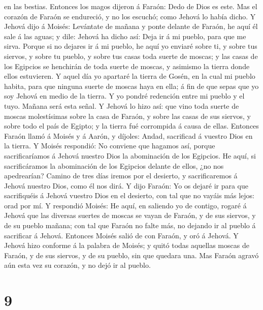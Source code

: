 en las bestias.  Entonces los magos dijeron á Faraón:
Dedo de Dios es este. Mas el corazón de Faraón se endureció, y no los
escuchó; como Jehová lo había dicho.  Y Jehová dijo á
Moisés: Levántate de mañana y ponte delante de Faraón, he aquí él sale á
las aguas; y dile: Jehová ha dicho así: Deja ir á mi pueblo, para que me
sirva.  Porque si no dejares ir á mi pueblo, he aquí yo
enviaré sobre ti, y sobre tus siervos, y sobre tu pueblo, y sobre tus
casas toda suerte de moscas; y las casas de los Egipcios se henchirán de
toda suerte de moscas, y asimismo la tierra donde ellos estuvieren.
 Y aquel día yo apartaré la tierra de Gosén, en la cual
mi pueblo habita, para que ninguna suerte de moscas haya en ella; á fin
de que sepas que yo soy Jehová en medio de la tierra.  Y
yo pondré redención entre mi pueblo y el tuyo. Mañana será esta señal.
 Y Jehová lo hizo así: que vino toda suerte de moscas
molestísimas sobre la casa de Faraón, y sobre las casas de sus siervos,
y sobre todo el país de Egipto; y la tierra fué corrompida á causa de
ellas.  Entonces Faraón llamó á Moisés y á Aarón, y
díjoles: Andad, sacrificad á vuestro Dios en la tierra. 
Y Moisés respondió: No conviene que hagamos así, porque sacrificaríamos
á Jehová nuestro Dios la abominación de los Egipcios. He aquí, si
sacrificáramos la abominación de los Egipcios delante de ellos, ¿no nos
apedrearían?  Camino de tres días iremos por el desierto,
y sacrificaremos á Jehová nuestro Dios, como él nos dirá.
 Y dijo Faraón: Yo os dejaré ir para que sacrifiquéis á
Jehová vuestro Dios en el desierto, con tal que no vayáis más lejos:
orad por mí.  Y respondió Moisés: He aquí, en saliendo yo
de contigo, rogaré á Jehová que las diversas suertes de moscas se vayan
de Faraón, y de sus siervos, y de su pueblo mañana; con tal que Faraón
no falte más, no dejando ir al pueblo á sacrificar á Jehová.
 Entonces Moisés salió de con Faraón, y oró á Jehová.
 Y Jehová hizo conforme á la palabra de Moisés; y quitó
todas aquellas moscas de Faraón, y de sus siervos, y de su pueblo, sin
que quedara una.  Mas Faraón agravó aún esta vez su
corazón, y no dejó ir al pueblo.

\hypertarget{section-8}{%
\section{9}\label{section-8}}

